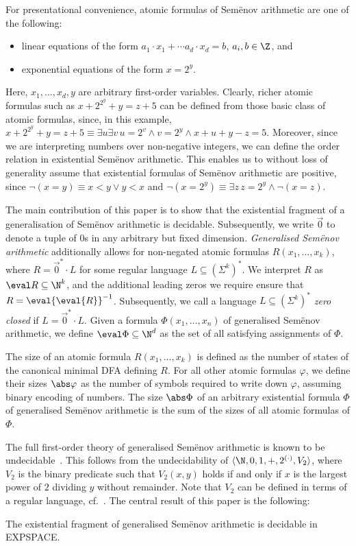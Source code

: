 For presentational convenience, atomic formulas of Sem{\"e}nov
arithmetic are one of the following:
%
\begin{itemize}
\item linear equations of the form $a_1 \cdot x_1 + \cdots a_d \cdot
  x_d = b$, $a_i,b \in \Z$, and
\item exponential equations of the form $x=2^y$.
\end{itemize}
%
Here, $x_1,\ldots,x_d,y$ are arbitrary first-order variables. Clearly,
richer atomic formulas such as $x + 2^{2^y} + y = z + 5$ can be
defined from those basic class of atomic formulas, since, in this
example, $x + 2^{2^y} + y = z + 5 \equiv \exists u\exists v\, u=2^v
\wedge v = 2^y \wedge x+u+y-z=5$. Moreover, since we are interpreting
numbers over non-negative integers, we can define the order relation
in existential Sem{\"e}nov arithmetic. This enables us to without loss
of generality assume that existential formulas of Sem{\"e}nov
arithmetic are positive, since $\neg (x=y) \equiv x<y \vee y<x$ and
$\neg(x=2^y) \equiv \exists z\, z=2^y \wedge \neg( x=z)$. 

The main contribution of this paper is to show that the existential
fragment of a generalisation of Sem{\"e}nov arithmetic is decidable.
Subsequently, we write $\vec 0$ to denote a tuple of 0s in any
arbitrary but fixed dimension. \emph{Generalised Sem{\"e}nov
  arithmetic} additionally allows for non-negated atomic formulas
$R(x_1,\ldots,x_k)$, where $R=\vec 0^*\cdot L$ for some regular
language $L\subseteq (\Sigma^k)^*$. We interpret $R$ as $\eval R
\subseteq \N^k$, and the additional leading zeros we require ensure
that $R=\eval{\eval{R}}^{-1}$. Subsequently, we call a language
$L\subseteq (\Sigma^k)^*$ \emph{zero closed} if $L = \vec 0^* \cdot
L$. Given a formula $\Phi(x_1,\ldots,x_n)$ of generalised Sem{\"e}nov
arithmetic, we define $\eval \Phi \subseteq \N^d$ as the set of all
satisfying assignments of $\Phi$.

The size of an atomic formula $R(x_1,\ldots,x_k)$ is defined as the
number of states of the canonical minimal DFA defining $R$. For all
other atomic formulas $\varphi$, we define their sizes $\abs \varphi$
as the number of symbols required to write down $\varphi$, assuming
binary encoding of numbers. The size $\abs \Phi$ of an arbitrary
existential formula $\Phi$ of generalised Sem{\"e}nov arithmetic is
the sum of the sizes of all atomic formulas of $\Phi$.

The full first-order theory of generalised Sem{\"e}nov arithmetic is
known to be undecidable~\cite{Point10}. This follows from the
undecidability of $\langle \N,0,1,+,2^{(\cdot)}, V_2 \rangle$, where
$V_2$ is the binary predicate such that $V_2(x,y)$ holds if and only
if $x$ is the largest power of $2$ dividing $y$ without
remainder. Note that $V_2$ can be defined in terms of a regular
language, cf.~\cite{BHMV94}. The central result of this paper is the
following:
%
\begin{theorem}\label{thm:main}
  The existential fragment of generalised Sem{\"e}nov arithmetic is
  decidable in EXPSPACE.
\end{theorem}



